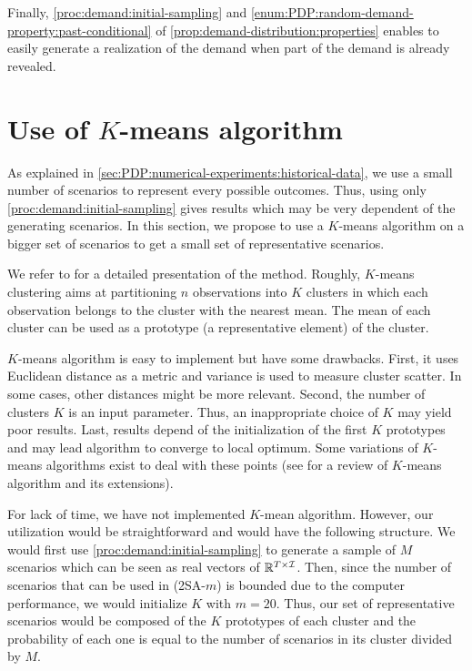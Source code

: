 Finally, \cref{proc:demand:initial-sampling} and \cref{enum:PDP:random-demand-property:past-conditional} of \cref{prop:demand-distribution:properties} enables to easily generate a realization of the demand when part of the demand is already revealed.



\section{Use of $K$-means algorithm}
\label{sec:PDP:numerical-experiments:k-means}


As explained in \cref{sec:PDP:numerical-experiments:historical-data}, we use a small number of scenarios to represent every possible outcomes.
Thus, using only \cref{proc:demand:initial-sampling} gives results which may be very dependent of the generating scenarios.
In this section, we propose to use a $K$-means algorithm on a bigger set of scenarios to get a small set of representative scenarios.


We refer to \citet[Chapter 14]{Hastie2009} for a detailed presentation of the method.
Roughly, $K$-means clustering aims at partitioning $n$ observations into $K$ clusters in which each observation belongs to the cluster with the nearest mean.
The mean of each cluster can be used as a prototype (\ie a representative element) of the cluster.


$K$-means algorithm is easy to implement but have some drawbacks.
First, it uses Euclidean distance as a metric and variance is used to measure cluster scatter.
In some cases, other distances might be more relevant.
Second, the number of clusters $K$ is an input parameter.
Thus, an inappropriate choice of $K$ may yield poor results.
Last, results depend of the initialization of the first $K$ prototypes and may lead algorithm to converge to local optimum.
Some variations of $K$-means algorithms exist to deal with these points (see \citet{Jain2010} for a review of $K$-means algorithm and its extensions).






For lack of time, we have not implemented $K$-mean algorithm.
However, our utilization would be straightforward and would have the following structure.
We would first use \cref{proc:demand:initial-sampling} to generate a sample of $M$ scenarios which can be seen as real vectors of $\mathbb{R}^{T\times\mathcal{I}}$.
Then, since the number of scenarios that can be used in (2SA-$m$) is bounded due to the computer performance, we would initialize $K$ with $m=20$.
Thus, our set of representative scenarios would be composed of the $K$ prototypes of each cluster and the probability of each one is equal to the number of scenarios in its cluster divided by $M$.



